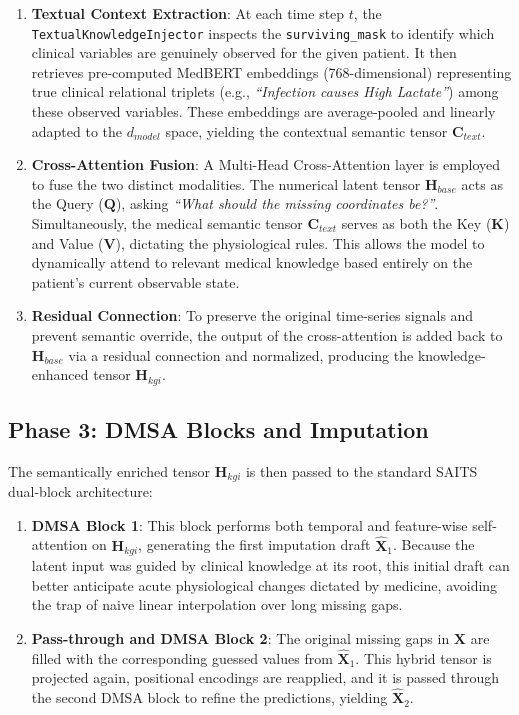 \documentclass{article}
\begin{document}
\begin{enumerate}
    \item \textbf{Textual Context Extraction}: At each time step $t$, the \texttt{TextualKnowledgeInjector} inspects the \texttt{surviving\_mask} to identify which clinical variables are genuinely observed for the given patient. It then retrieves pre-computed MedBERT embeddings (768-dimensional) representing true clinical relational triplets (e.g., \textit{``Infection causes High Lactate''}) among these observed variables. These embeddings are average-pooled and linearly adapted to the $d_{model}$ space, yielding the contextual semantic tensor $\mathbf{C}_{text}$.
    
    \item \textbf{Cross-Attention Fusion}: A Multi-Head Cross-Attention layer is employed to fuse the two distinct modalities. The numerical latent tensor $\mathbf{H}_{base}$ acts as the Query ($\mathbf{Q}$), asking \textit{``What should the missing coordinates be?''}. Simultaneously, the medical semantic tensor $\mathbf{C}_{text}$ serves as both the Key ($\mathbf{K}$) and Value ($\mathbf{V}$), dictating the physiological rules. This allows the model to dynamically attend to relevant medical knowledge based entirely on the patient's current observable state.
    
    \item \textbf{Residual Connection}: To preserve the original time-series signals and prevent semantic override, the output of the cross-attention is added back to $\mathbf{H}_{base}$ via a residual connection and normalized, producing the knowledge-enhanced tensor $\mathbf{H}_{kgi}$.
\end{enumerate}

\subsection{Phase 3: DMSA Blocks and Imputation}
The semantically enriched tensor $\mathbf{H}_{kgi}$ is then passed to the standard SAITS dual-block architecture:

\begin{enumerate}
    \item \textbf{DMSA Block 1}: This block performs both temporal and feature-wise self-attention on $\mathbf{H}_{kgi}$, generating the first imputation draft $\mathbf{\hat{X}}_1$. Because the latent input was guided by clinical knowledge at its root, this initial draft can better anticipate acute physiological changes dictated by medicine, avoiding the trap of naive linear interpolation over long missing gaps.
    
    \item \textbf{Pass-through and DMSA Block 2}: The original missing gaps in $\mathbf{X}$ are filled with the corresponding guessed values from $\mathbf{\hat{X}}_1$. This hybrid tensor is projected again, positional encodings are reapplied, and it is passed through the second DMSA block to refine the predictions, yielding $\mathbf{\hat{X}}_2$.
\end{enumerate}
\end{document}
